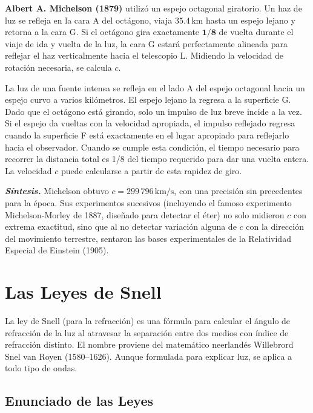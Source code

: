 \documentclass[12pt, a4paper]{article}
\theoremstyle{definition}
\begin{document}
\textbf{Albert A. Michelson (1879)} utilizó un espejo octagonal giratorio. Un haz de luz se
refleja en la cara A del octágono, viaja \(35.4\,\text{km}\) hasta un espejo lejano y retorna
a la cara G. Si el octágono gira exactamente \(\mathbf{1/8}\) de vuelta durante el viaje de ida
y vuelta de la luz, la cara G estará perfectamente alineada para reflejar el haz verticalmente
hacia el telescopio L. Midiendo la velocidad de rotación necesaria, se calcula \(c\).

La luz de una fuente intensa se refleja en el lado A del espejo octagonal hacia un espejo curvo
a varios kilómetros. El espejo lejano la regresa a la superficie G. Dado que el octágono está
girando, solo un impulso de luz breve incide a la vez. Si el espejo da vueltas con la velocidad
apropiada, el impulso reflejado regresa cuando la superficie F está exactamente en el lugar
apropiado para reflejarlo hacia el observador. Cuando se cumple esta condición, el tiempo
necesario para recorrer la distancia total es 1/8 del tiempo requerido para dar una vuelta
entera. La velocidad \(c\) puede calcularse a partir de esta rapidez de giro.

\textit{\textbf{Síntesis.}} Michelson obtuvo \(c = 299\,796\,\text{km/s}\), con una precisión
sin precedentes para la época. Sus experimentos sucesivos (incluyendo el famoso experimento
Michelson-Morley de 1887, diseñado para detectar el éter) no solo midieron \(c\) con extrema
exactitud, sino que al no detectar variación alguna de \(c\) con la dirección del movimiento
terrestre, sentaron las bases experimentales de la Relatividad Especial de Einstein (1905).

\section{Las Leyes de Snell}
\label{sec:snell}

La ley de Snell (para la refracción) es una fórmula para calcular el ángulo de refracción de
la luz al atravesar la separación entre dos medios con índice de refracción distinto. El nombre
proviene del matemático neerlandés Willebrord Snel van Royen (1580--1626). Aunque formulada
para explicar luz, se aplica a todo tipo de ondas.

\subsection{Enunciado de las Leyes}
\end{document}
